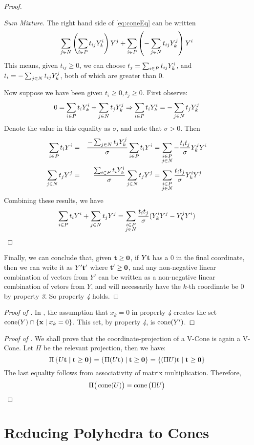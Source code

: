 \begin{proof}
\begin{proof}[Sum Mixture]
		The right hand side of \eqref{eq:coneEq} can be written
		\[ \sum_{j\in N} \left(\sum_{i\in P} t_{ij}Y^i_{k}\right) Y^j +
			\sum_{i\in P} \left(-\sum_{j\in N} t_{ij}Y^j_{k}\right) Y^i \]
		This means, given $t_{ij} \geq 0$, we can choose $t_j = \sum_{i\in P} t_{ij}Y^i_{k}$, and $t_i = -\sum_{j\in N} t_{ij}Y^j_{k}$, both of which are greater than $0$.

		Now suppose we have been given $t_i \geq 0, t_j \geq 0$.  First observe:
		\[ 0 = \sum_{i\in P} t_iY^i_{k} + \sum_{j\in N} t_jY^j_{k} \Rightarrow \sum_{i\in P} t_iY^i_{k} = -\sum_{j\in N} t_jY^j_{k}\]
		Denote the value in this equality as $\sigma$, and note that $\sigma > 0$.  Then
		\begin{alignat*}{3}
			\sum_{i\in P} t_i Y^i & = & \frac{-\sum_{j\in N} t_j Y^j_{k}}{\sigma}\sum_{i\in P} t_i Y^i & =
			\sum_{\substack{i\in P \\ j\in N}} -\frac{t_i t_j}{\sigma}Y^j_{k} Y^i                              \\
			\sum_{j\in N} t_j Y^j & = & \frac{\sum_{i\in P} t_i Y^i_{k}}{\sigma}\sum_{j\in N} t_j Y^j  & =
			\sum_{\substack{i\in P \\ j\in N}} \frac{t_i t_j}{\sigma}Y^i_{k} Y^j
		\end{alignat*}
		Combining these results, we have
		\[ \sum_{i\in P} t_i Y^i + \sum_{j\in N} t_j Y^j = \sum_{\substack{i\in P \\ j\in N}} \frac{t_i t_j}{\sigma}(Y^i_{k} Y^j - Y^j_{k} Y^i) \]
	\end{proof}
	Finally, we can conclude that, given $\mathbf{t} \geq \mathbf{0}$, if $Y\mathbf{t}$ has a $0$ in the final coordinate, then we can write it as $ Y'\mathbf{t}'$ where $\mathbf{t}' \geq \mathbf{0}$, and any non-negative linear combination of vectors from $Y'$ can be written as a non-negative linear combination of vetors from $Y$, and will necessarily have the $k$-th coordinate be $0$ by property \textit{3}.  So property \textit{4} holds.
\end{proof}

\begin{proof}[Proof of {\Hint}]
	In , the assumption that $x_k = 0$ in property \textit{4} creates the set $\operatorname{cone}(Y) \cap \left\{\mathbf{x} \;|\; x_k = 0\right\}$.  This set, by property \textit{4}, is $\operatorname{cone}(Y')$.
\end{proof}

\begin{proof}[Proof of {\Hproj}]
	We shall prove that the coordinate-projection of a V-Cone is again a V-Cone.  Let $\Pi$ be the relevant projection, then we have:
	\[ \Pi\left\{U\mathbf{t} \;|\; \mathbf{t} \geq \mathbf{0}\right\} = \left\{\Pi(U\mathbf{t}) \;|\; \mathbf{t} \geq \mathbf{0}\right\} =
		\left\{(\Pi U)\mathbf{t} \;|\; \mathbf{t} \geq \mathbf{0}\right\} \]
	The last equality follows from associativity of matrix multiplication.  Therefore,
	\[ \Pi\big(\operatorname{cone}(U)\big) = \operatorname{cone}\big(\Pi U\big) \]
\end{proof}

\section{Reducing Polyhedra to Cones}


